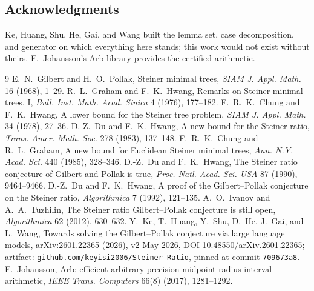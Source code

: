 \documentclass[11pt]{article}
\begin{document}
\subsection*{Acknowledgments}
Ke, Huang, Shu, He, Gai, and Wang \cite{PKU26} built the lemma set, case
decomposition, and generator on which everything here stands; this work
would not exist without theirs. F.~Johansson's Arb library \cite{Arb17}
provides the certified arithmetic.

\begin{thebibliography}{9}
 E.~N.~Gilbert and H.~O.~Pollak, Steiner minimal trees,
\emph{SIAM J. Appl. Math.} 16 (1968), 1--29.
 R.~L.~Graham and F.~K.~Hwang, Remarks on Steiner minimal
trees, I, \emph{Bull. Inst. Math. Acad. Sinica} 4 (1976), 177--182.
 F.~R.~K.~Chung and F.~K.~Hwang, A lower bound for the
Steiner tree problem, \emph{SIAM J. Appl. Math.} 34 (1978), 27--36.
 D.-Z.~Du and F.~K.~Hwang, A new bound for the Steiner
ratio, \emph{Trans. Amer. Math. Soc.} 278 (1983), 137--148.
 F.~R.~K.~Chung and R.~L.~Graham, A new bound for
Euclidean Steiner minimal trees, \emph{Ann. N.Y. Acad. Sci.} 440 (1985),
328--346.
 D.-Z.~Du and F.~K.~Hwang, The Steiner ratio conjecture
of Gilbert and Pollak is true, \emph{Proc. Natl. Acad. Sci. USA} 87
(1990), 9464--9466.
 D.-Z.~Du and F.~K.~Hwang, A proof of the Gilbert--Pollak
conjecture on the Steiner ratio, \emph{Algorithmica} 7 (1992), 121--135.
 A.~O.~Ivanov and A.~A.~Tuzhilin, The Steiner ratio
Gilbert--Pollak conjecture is still open, \emph{Algorithmica} 62 (2012),
630--632.
 Y.~Ke, T.~Huang, Y.~Shu, D.~He, J.~Gai, and L.~Wang,
Towards solving the Gilbert--Pollak conjecture via large language
models, arXiv:2601.22365 (2026), v2 May 2026,
DOI 10.48550/arXiv.2601.22365; artifact:
\texttt{github.com/keyisi2006/Steiner-Ratio}, pinned at commit
\texttt{709673a8}.
 F.~Johansson, Arb: efficient arbitrary-precision
midpoint-radius interval arithmetic, \emph{IEEE Trans. Computers} 66(8)
(2017), 1281--1292.
\end{thebibliography}
\end{document}
